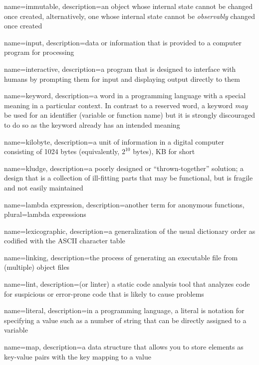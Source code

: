 {
  name=immutable,
  description={an object whose internal state cannot be changed once created, alternatively, one whose internal state
  cannot be \emph{observably} changed once created}
}

{
  name=input,
  description={data or information that is provided to a computer program for processing}
}

{
  name=interactive,
  description={a program that is designed to interface with humans by prompting them for input and displaying output directly to them}
}

{
  name=keyword,
  description={a word in a programming language with a special meaning in a particular context.  In
	contrast to a reserved word, a keyword \emph{may} be used for an identifier (variable or function name)
	but it is strongly discouraged to do so as the keyword already has an intended meaning}
}

{
  name=kilobyte,
  description={a unit of information in a digital computer consisting of 1024 bytes (equivalently, $2^{10}$ bytes), KB for short}
}

{
  name=kludge,
  description={a poorly designed or ``thrown-together'' solution; a design that is a collection of ill-fitting parts that may be functional, but is fragile and not easily maintained}
}

{
  name=lambda expression,
  description={another term for anonymous functions},
  plural=lambda expressions
}

{
  name=lexicographic,
  description={a generalization of the usual dictionary order as codified with the ASCII character table}
}

{
  name=linking,
  description={the process of generating an executable file from (multiple) object files}
}

{
  name=lint,
  description={(or linter) a static code analysis tool that analyzes code for suspicious or error-prone code that is likely to cause problems}
}

{
  name=literal,
  description={in a programming language, a literal is notation for specifying a value such as a number of string that can be 
  	directly assigned to a variable}
}

{
  name=map,
  description={a data structure that allows you to store elements as key-value pairs with the key mapping to a value}
}

